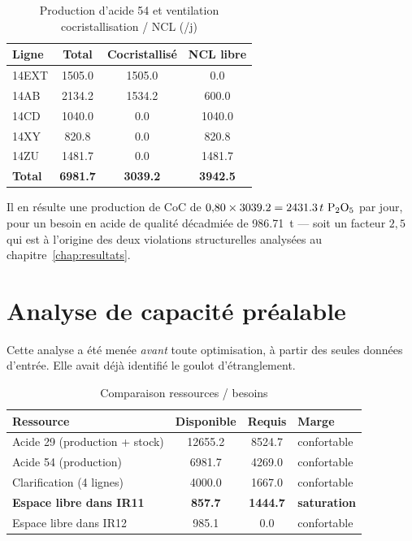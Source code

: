 \begin{table}[H]
\centering
\caption{Production d'acide 54 et ventilation cocristallisation / NCL (\tP/j)}
\label{tab:prod54-detail}
\begin{tabular}{@{}lS[table-format=4.1]S[table-format=4.1]S[table-format=4.1]@{}}
\toprule
\textbf{Ligne} & {\textbf{Total}} & {\textbf{Cocristallisé}} & {\textbf{NCL libre}} \\
\midrule
14EXT & 1505.0 & 1505.0 & 0.0 \\
14AB & 2134.2 & 1534.2 & 600.0 \\
14CD & 1040.0 & 0.0 & 1040.0 \\
14XY & 820.8 & 0.0 & 820.8 \\
14ZU & 1481.7 & 0.0 & 1481.7 \\
\midrule
\textbf{Total} & \bfseries 6981.7 & \bfseries 3039.2 & \bfseries 3942.5 \\
\bottomrule
\end{tabular}
\end{table}

Il en résulte une production de CoC de $0{,}80 \times \num{3039,2} = \num{2431,3}\,t~\mathrm{P_2O_5}$ par
jour, pour un besoin en acide de qualité décadmiée de \SI{986,71}{\tonne} --- soit un facteur
$2{,}5$ qui est à l'origine des deux violations structurelles analysées au
chapitre~\ref{chap:resultats}.

\section{Analyse de capacité préalable}

Cette analyse a été menée \emph{avant} toute optimisation, à partir des seules données
d'entrée. Elle avait déjà identifié le goulot d'étranglement.

\begin{table}[H]
\centering
\caption{Comparaison ressources / besoins}
\label{tab:capacite}
\begin{tabular}{@{}lS[table-format=5.1]S[table-format=5.1]l@{}}
\toprule
\textbf{Ressource} & {\textbf{Disponible}} & {\textbf{Requis}} & \textbf{Marge} \\
\midrule
Acide 29 (production + stock) & 12655.2 & 8524.7 & confortable \\
Acide 54 (production) & 6981.7 & 4269.0 & confortable \\
Clarification (4 lignes) & 4000.0 & 1667.0 & confortable \\
\textbf{Espace libre dans IR11} & \bfseries 857.7 & \bfseries 1444.7 & \bfseries saturation \\
Espace libre dans IR12 & 985.1 & 0.0 & confortable \\
\bottomrule
\end{tabular}
\end{table}

